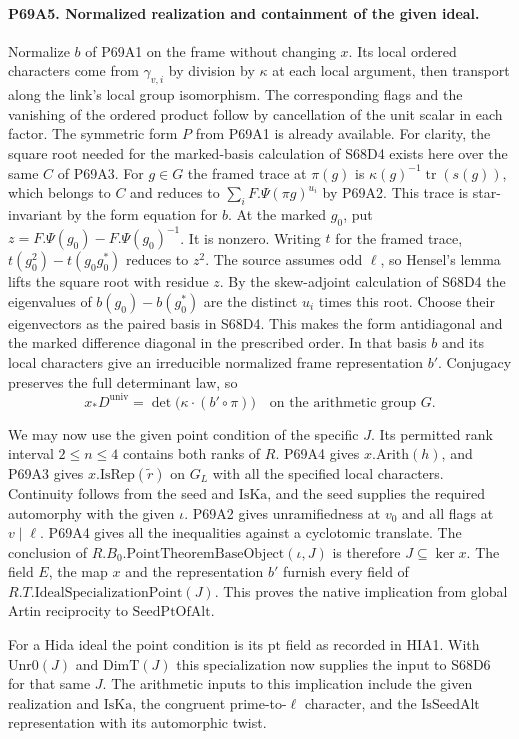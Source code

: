 \paragraph{P69A5. Normalized realization and containment of the given ideal.}
Normalize $b$ of P69A1 on the frame without changing $x$.
Its local ordered characters come from $\gamma_{v,i}$ by
division by $\kappa$ at each local argument, then transport along
the link's local group isomorphism. The corresponding flags
and the vanishing of the ordered product follow by cancellation
of the unit scalar in each factor. The symmetric form $P$ from
P69A1 is already available. For clarity, the square root needed
for the marked-basis calculation of S68D4 exists here over
the same $C$ of P69A3. For $g\in G$ the framed trace at
$\pi(g)$ is $\kappa(g)^{-1}\operatorname{tr}(s(g))$,
which belongs to $C$ and reduces to
$\sum_i F.\Psi(\pi g)^{u_i}$ by P69A2. This trace is
star-invariant by the form equation for $b$.
At the marked $g_0$, put $z=F.\Psi(g_0)-F.\Psi(g_0)^{-1}$.
It is nonzero. Writing $t$ for the framed trace,
$t(g_0^2)-t(g_0g_0^*)$ reduces to $z^2$.
The source assumes odd $\ell$, so Hensel's lemma lifts the
square root with residue $z$. By the skew-adjoint calculation
of S68D4 the eigenvalues of $b(g_0)-b(g_0^*)$ are the
distinct $u_i$ times this root. Choose their eigenvectors as
the paired basis in S68D4. This makes the form antidiagonal
and the marked difference diagonal in the prescribed order.
In that basis $b$ and its local characters give an irreducible
normalized frame representation $b'$. Conjugacy preserves the
full determinant law, so
\[
 x_*D^{\mathrm{univ}}=\det\bigl(\kappa\cdot(b'\circ\pi)\bigr)
             \quad\text{on the arithmetic group }G .
\]

We may now use the given point condition of the specific $J$.
Its permitted rank interval $2\le n\le4$ contains both ranks
of $R$. P69A4 gives $x.\mathrm{Arith}(h)$, and P69A3 gives
$x.\mathrm{IsRep}(\widetilde r)$ on $G_L$ with all the specified
local characters. Continuity follows from the seed and
$\mathrm{IsKa}$, and the seed supplies the required automorphy
with the given $\iota$. P69A2 gives unramifiedness at $v_0$ and
all flags at $v\mid\ell$. P69A4 gives all the inequalities
against a cyclotomic translate. The conclusion of
$R.B_0.\mathrm{PointTheoremBaseObject}(\iota,J)$ is therefore
$J\subseteq\ker x$. The field $E$, the map $x$ and the
representation $b'$ furnish every field of
$R.T.\mathrm{IdealSpecializationPoint}(J)$. This proves the
native implication from global Artin reciprocity to
$\mathrm{SeedPtOfAlt}$.

For a Hida ideal the point condition is its $\mathrm{pt}$ field
as recorded in HIA1. With $\mathrm{Unr0}(J)$ and
$\mathrm{DimT}(J)$ this specialization now supplies the input
to S68D6 for that same $J$. The arithmetic inputs to this
implication include the given realization and $\mathrm{IsKa}$,
the congruent prime-to-$\ell$ character, and the
$\mathrm{IsSeedAlt}$ representation with its automorphic twist.

